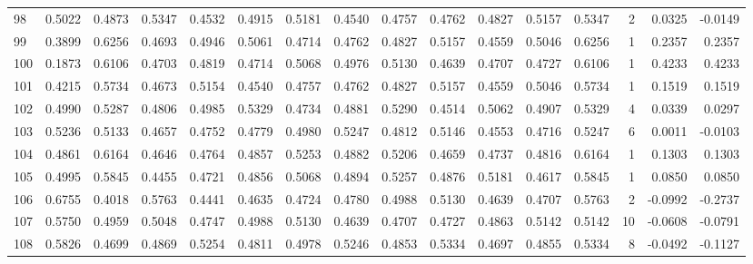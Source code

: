 \begin{tabular}{lrrrrrrrrrrrrrrr}
98  &      0.5022 &  0.4873 &  0.5347 &  0.4532 &  0.4915 &  0.5181 &  0.4540 &  0.4757 &  0.4762 &  0.4827 &   0.5157 &     0.5347 &      2 &                    0.0325 &                    -0.0149 \\
99  &      0.3899 &  0.6256 &  0.4693 &  0.4946 &  0.5061 &  0.4714 &  0.4762 &  0.4827 &  0.5157 &  0.4559 &   0.5046 &     0.6256 &      1 &                    0.2357 &                     0.2357 \\
100 &      0.1873 &  0.6106 &  0.4703 &  0.4819 &  0.4714 &  0.5068 &  0.4976 &  0.5130 &  0.4639 &  0.4707 &   0.4727 &     0.6106 &      1 &                    0.4233 &                     0.4233 \\
101 &      0.4215 &  0.5734 &  0.4673 &  0.5154 &  0.4540 &  0.4757 &  0.4762 &  0.4827 &  0.5157 &  0.4559 &   0.5046 &     0.5734 &      1 &                    0.1519 &                     0.1519 \\
102 &      0.4990 &  0.5287 &  0.4806 &  0.4985 &  0.5329 &  0.4734 &  0.4881 &  0.5290 &  0.4514 &  0.5062 &   0.4907 &     0.5329 &      4 &                    0.0339 &                     0.0297 \\
103 &      0.5236 &  0.5133 &  0.4657 &  0.4752 &  0.4779 &  0.4980 &  0.5247 &  0.4812 &  0.5146 &  0.4553 &   0.4716 &     0.5247 &      6 &                    0.0011 &                    -0.0103 \\
104 &      0.4861 &  0.6164 &  0.4646 &  0.4764 &  0.4857 &  0.5253 &  0.4882 &  0.5206 &  0.4659 &  0.4737 &   0.4816 &     0.6164 &      1 &                    0.1303 &                     0.1303 \\
105 &      0.4995 &  0.5845 &  0.4455 &  0.4721 &  0.4856 &  0.5068 &  0.4894 &  0.5257 &  0.4876 &  0.5181 &   0.4617 &     0.5845 &      1 &                    0.0850 &                     0.0850 \\
106 &      0.6755 &  0.4018 &  0.5763 &  0.4441 &  0.4635 &  0.4724 &  0.4780 &  0.4988 &  0.5130 &  0.4639 &   0.4707 &     0.5763 &      2 &                   -0.0992 &                    -0.2737 \\
107 &      0.5750 &  0.4959 &  0.5048 &  0.4747 &  0.4988 &  0.5130 &  0.4639 &  0.4707 &  0.4727 &  0.4863 &   0.5142 &     0.5142 &     10 &                   -0.0608 &                    -0.0791 \\
108 &      0.5826 &  0.4699 &  0.4869 &  0.5254 &  0.4811 &  0.4978 &  0.5246 &  0.4853 &  0.5334 &  0.4697 &   0.4855 &     0.5334 &      8 &                   -0.0492 &                    -0.1127 \\

\end{tabular}

